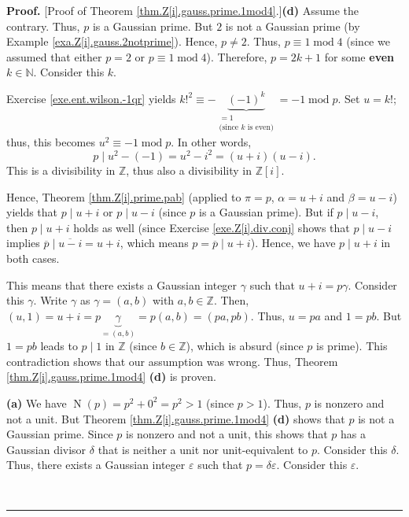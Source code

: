\documentclass[numbers=enddot,12pt,final,onecolumn,notitlepage]{scrartcl}%
\numberwithin{exer}{subsection}
\theoremstyle{definition}
\newenvironment{proof}[1][Proof]{\noindent\textbf{#1.} }{\ \rule{0.5em}{0.5em}}
\begin{document}
\begin{proof}
[Proof of Theorem \ref{thm.Z[i].gauss.prime.1mod4}.]\textbf{(d)} Assume the
contrary. Thus, $p$ is a Gaussian prime. But $2$ is not a Gaussian prime (by
Example \ref{exa.Z[i].gauss.2notprime}). Hence, $p\neq2$. Thus, $p\equiv
1\operatorname{mod}4$ (since we assumed that either $p=2$ or $p\equiv
1\operatorname{mod}4$). Therefore, $p=2k+1$ for some \textbf{even}
$k\in\mathbb{N}$. Consider this $k$.

Exercise \ref{exe.ent.wilson.-1qr} yields $k!^{2}\equiv-\underbrace{\left(
-1\right)  ^{k}}_{\substack{=1\\\text{(since }k\text{ is even)}}%
}=-1\operatorname{mod}p$. Set $u=k!$; thus, this becomes $u^{2}\equiv
-1\operatorname{mod}p$. In other words,
\[
p\mid u^{2}-\left(  -1\right)  =u^{2}-i^{2}=\left(  u+i\right)  \left(
u-i\right)  .
\]
This is a divisibility in $\mathbb{Z}$, thus also a divisibility in
$\mathbb{Z}\left[  i\right]  $.

Hence, Theorem \ref{thm.Z[i].prime.pab} (applied to $\pi=p$, $\alpha=u+i$ and
$\beta=u-i$) yields that $p\mid u+i$ or $p\mid u-i$ (since $p$ is a Gaussian
prime). But if $p\mid u-i$, then $p\mid u+i$ holds as well (since Exercise
\ref{exe.Z[i].div.conj} shows that $p\mid u-i$ implies $\overline{p}%
\mid\overline{u-i}=u+i$, which means $p=\overline{p}\mid u+i$). Hence, we have
$p\mid u+i$ in both cases.

This means that there exists a Gaussian integer $\gamma$ such that
$u+i=p\gamma$. Consider this $\gamma$. Write $\gamma$ as $\gamma=\left(
a,b\right)  $ with $a,b\in\mathbb{Z}$. Then, $\left(  u,1\right)
=u+i=p\underbrace{\gamma}_{=\left(  a,b\right)  }=p\left(  a,b\right)
=\left(  pa,pb\right)  $. Thus, $u=pa$ and $1=pb$. But $1=pb$ leads to
$p\mid1$ in $\mathbb{Z}$ (since $b\in\mathbb{Z}$), which is absurd (since $p$
is prime). This contradiction shows that our assumption was wrong. Thus,
Theorem \ref{thm.Z[i].gauss.prime.1mod4} \textbf{(d)} is proven.

\textbf{(a)} We have $\operatorname*{N}\left(  p\right)  =p^{2}+0^{2}=p^{2}>1$
(since $p>1$). Thus, $p$ is nonzero and not a unit. But Theorem
\ref{thm.Z[i].gauss.prime.1mod4} \textbf{(d)} shows that $p$ is not a Gaussian
prime. Since $p$ is nonzero and not a unit, this shows that $p$ has a Gaussian
divisor $\delta$ that is neither a unit nor unit-equivalent to $p$. Consider
this $\delta$. Thus, there exists a Gaussian integer $\varepsilon$ such that
$p=\delta\varepsilon$. Consider this $\varepsilon$.


\end{proof}
\end{document}
